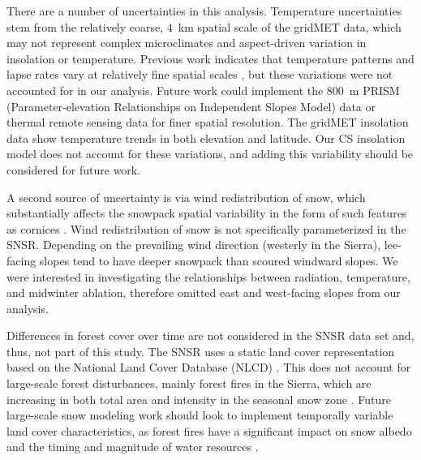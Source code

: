 There are a number of uncertainties in this analysis. Temperature uncertainties stem from the relatively coarse, 4~km spatial scale of the gridMET data, which may not represent complex microclimates and aspect-driven variation in insolation or temperature. Previous work indicates that temperature patterns and lapse rates vary at relatively fine spatial scales \citep{lundquistSurfaceTemperaturePatterns2007, robledanoModellingSurfaceTemperature2022}, but these variations were not accounted for in our analysis. Future work could implement the 800~m PRISM (Parameter-elevation Relationships on Independent Slopes Model) data \citep{dalyStatisticalTopographicModelMapping1994} or thermal remote sensing data \citep{kalmaEstimatingLandSurface2008,lundquistSeparatingSnowForest2018} for finer spatial resolution. The gridMET insolation data show temperature trends in both elevation and latitude. Our CS insolation model does not account for these variations, and adding this variability should be considered for future work.

A second source of uncertainty is via wind redistribution of snow, which substantially affects the snowpack spatial variability in the form of such features as cornices \citep{winstralSpatialSnowModeling2002,marksSimulationTerrainForest2002}. Wind redistribution of snow is not specifically parameterized in the SNSR. Depending on the prevailing wind direction (westerly in the Sierra), lee-facing slopes tend to have deeper snowpack than scoured windward slopes. We were interested in investigating the relationships between radiation, temperature, and midwinter ablation, therefore omitted east and west-facing slopes from our analysis.

Differences in forest cover over time are not considered in the SNSR data set and, thus, not part of this study. The SNSR uses a static land cover representation based on the National Land Cover Database (NLCD) \citep{homerConterminousUnitedStates2020}. This does not account for large-scale forest disturbances, mainly forest fires in the Sierra, which are increasing in both total area and intensity in the seasonal snow zone \citep{koshkinWildfireImpactsWestern2022}. Future large-scale snow modeling work should look to implement temporally variable land cover characteristics, as forest fires have a significant impact on snow albedo \citep{gleasonCharredForestsIncrease2013} and the timing and magnitude of water resources \citep{williamsGrowingImpactWildfire2022}.

